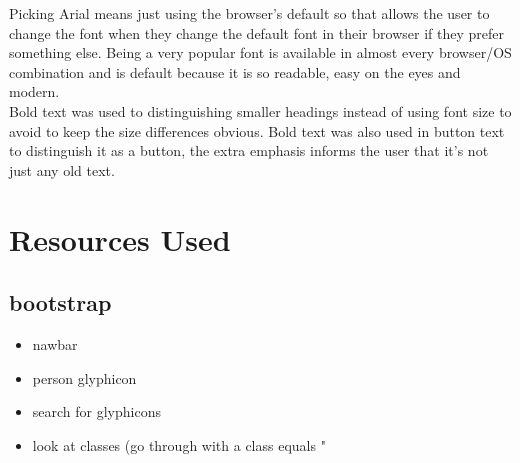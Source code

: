 \documentclass[10pt,a4paper]{article}
\begin{document}
	Picking Arial means just using the browser's default so that allows the user to change the font when they change the default font in their browser if they prefer something else. Being a very popular font is available in almost every browser/OS combination and is default because it is so readable, easy on the eyes and modern. \\
	
	Bold text was used to distinguishing smaller headings instead of using font size to avoid to keep the size differences obvious. Bold text was also used in button text to distinguish it as a button, the extra emphasis informs the user that it's not just any old text.
	
	
\section{Resources Used}
	\subsection*{bootstrap}
		\begin{itemize}
			\item nawbar
			\item person glyphicon
			\item search for glyphicons
			\item look at classes (go through with a class equals "
		\end{itemize}
\end{document}
